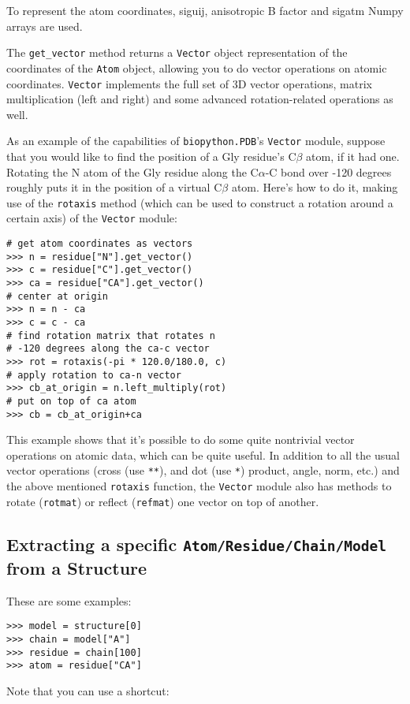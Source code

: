 To represent the atom coordinates, siguij, anisotropic B factor and sigatm Numpy
arrays are used.

The \texttt{get\_vector} method returns a \texttt{Vector} object representation of the coordinates of the \texttt{Atom} object, allowing you to do vector operations on atomic coordinates. \texttt{Vector} implements the full set of 3D vector operations, matrix multiplication (left and right) and some advanced rotation-related operations as well.

As an example of the capabilities of \verb+biopython.PDB+'s \texttt{Vector} module,
suppose that you would like to find the position of a Gly residue's C$\beta$
atom, if it had one. Rotating the N atom of
the Gly residue along the C$\alpha$-C bond over -120 degrees roughly
puts it in the position of a virtual C$\beta$ atom. Here's how to
do it, making use of the \texttt{rotaxis} method (which can be used
to construct a rotation around a certain axis) of the \texttt{Vector}
module:

\begin{verbatim}
# get atom coordinates as vectors
>>> n = residue["N"].get_vector()
>>> c = residue["C"].get_vector()
>>> ca = residue["CA"].get_vector()
# center at origin
>>> n = n - ca
>>> c = c - ca
# find rotation matrix that rotates n
# -120 degrees along the ca-c vector
>>> rot = rotaxis(-pi * 120.0/180.0, c)
# apply rotation to ca-n vector
>>> cb_at_origin = n.left_multiply(rot)
# put on top of ca atom
>>> cb = cb_at_origin+ca
\end{verbatim}
This example shows that it's possible to do some quite nontrivial
vector operations on atomic data, which can be quite useful. In addition
to all the usual vector operations (cross (use \texttt{{*}{*}}), and
dot (use \texttt{{*}}) product, angle, norm, etc.) and the above mentioned
\texttt{rotaxis} function, the \texttt{Vector} module also has methods
to rotate (\texttt{rotmat}) or reflect (\texttt{refmat}) one vector
on top of another.

\subsection{Extracting a specific \texttt{Atom/\-Residue/\-Chain/\-Model}
from a Structure}

These are some examples:

\begin{verbatim}
>>> model = structure[0]
>>> chain = model["A"]
>>> residue = chain[100]
>>> atom = residue["CA"]
\end{verbatim}
Note that you can use a shortcut:

